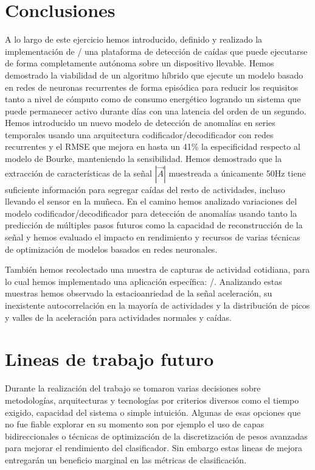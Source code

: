
\section{Conclusiones}

A lo largo de este ejercicio hemos introducido, definido y realizado la implementación de \ifell/ una plataforma de detección de caídas que puede ejecutarse de forma completamente autónoma sobre un dispositivo llevable. Hemos demostrado la viabilidad de un algoritmo híbrido que ejecute un modelo basado en redes de neuronas recurrentes de forma episódica para reducir los requisitos tanto a nivel de cómputo como de consumo energético logrando un sistema que puede permanecer activo durante días con una latencia del orden de un segundo. Hemos introducido un nuevo modelo de detección de anomalías en series temporales usando una arquitectura codificador/decodificador con redes recurrentes y el RMSE que mejora en hasta un 41\% la especificidad respecto al modelo de Bourke, manteniendo la sensibilidad. Hemos demostrado que la extracción de características de la señal $|\vec{A}|$ muestreada a únicamente 50Hz tiene suficiente información para segregar caídas del resto de actividades, incluso llevando el sensor en la muñeca. En el camino hemos analizado variaciones del modelo codificador/decodificador para detección de anomalías usando tanto la predicción de múltiples pasos futuros como la capacidad de reconstrucción de la señal y hemos evaluado el impacto en rendimiento y recursos de varias técnicas de optimización de modelos basados en redes neuronales.

También hemos recolectado una muestra de capturas de actividad cotidiana, para lo cual hemos implementado una aplicación específica: \accelcapture/. Analizando estas muestras hemos observado la estacioanriedad de la señal aceleración, su inexistente autocorrelación en la mayoría de actividades y la distribución de picos y valles de la aceleración para actividades normales y caídas.

\section{Lineas de trabajo futuro}

Durante la realización del trabajo se tomaron varias decisiones sobre metodologías, arquitecturas y tecnologías por criterios diversos como el tiempo exigido, capacidad del sistema o simple intuición. Algunas de esas opciones que no fue fiable explorar en su momento son por ejemplo el uso de capas bidireccionales o técnicas de optimización de la discretización de pesos avanzadas para mejorar el rendimiento del clasificador. Sin embargo estas lineas de mejora entregarán un beneficio marginal en las métricas de clasificación.

